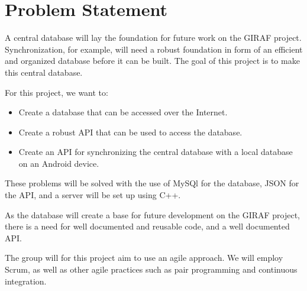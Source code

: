 \section{Problem Statement}
A central database will lay the foundation for future work on the GIRAF project. Synchronization, for example, will need a robust foundation in form of an efficient and organized database before it can be built. The goal of this project is to make this central database.

For this project, we want to:
\begin{itemize}
\item Create a database that can be accessed over the Internet.
\item Create a robust API that can be used to access the database.
\item Create an API for synchronizing the central database with a local database on an Android device.
\end{itemize}

These problems will be solved with the use of MySQl for the database, JSON for the API, and a server will be set up using C++.

As the database will create a base for future development on the GIRAF project, there is a need for well documented and reusable code, and a well documented API.

The group will for this project aim to use an agile approach. We will employ Scrum, as well as other agile practices such as pair programming and continuous integration.